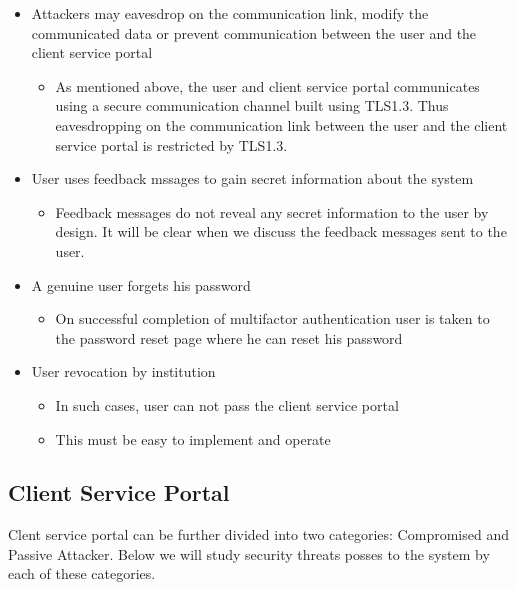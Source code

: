 \begin{itemize}
    \item Attackers may eavesdrop on the communication link, modify the communicated data or prevent communication between the user and the client service portal
          \begin{itemize}
              \item As mentioned above, the user and client service portal communicates using a secure communication channel built using TLS1.3. Thus eavesdropping on the communication link between the user and the client service portal is restricted by TLS1.3.
          \end{itemize}

    \item User uses feedback mssages to gain secret information about the system
          \begin{itemize}
              \item Feedback messages do not reveal any secret information to the user by design. It will be clear when we discuss the feedback messages sent to the user.
          \end{itemize}
    \item A genuine user forgets his password
          \begin{itemize}
              \item On successful completion of multifactor authentication user is taken to the password reset page where he can reset his password
          \end{itemize}
    \item User revocation by institution
          \begin{itemize}
              \item In such cases, user can not pass the client service portal
              \item This must be easy to implement and operate
          \end{itemize}
\end{itemize}


\subsection{Client Service Portal}

Clent service portal can be further divided into two categories: Compromised and Passive Attacker. Below we will study security threats posses to the system by each of these categories.
